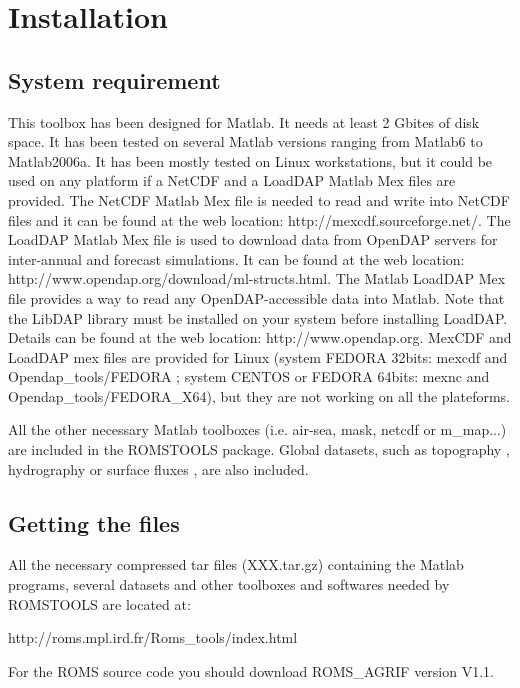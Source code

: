 \section{Installation}
\subsection{System requirement}
This toolbox has been designed for Matlab. It needs at least 
2 Gbites of disk space. It has been tested on several 
Matlab versions ranging from Matlab6 to Matlab2006a. It has been 
mostly tested on Linux workstations, but it could be used 
on any platform if a NetCDF and a LoadDAP  Matlab Mex files  
are provided. The NetCDF Matlab Mex file is needed to read 
and write into NetCDF files and it can be found at the web 
location: http://mexcdf.sourceforge.net/. The LoadDAP Matlab Mex file
is used to download data from OpenDAP servers for inter-annual and forecast 
simulations. It can be found at the web location: 
http://www.opendap.org/download/ml-structs.html. The Matlab 
LoadDAP Mex file provides a way to read any OpenDAP-accessible 
data into Matlab. Note that the LibDAP library must be installed
on your system before installing LoadDAP. Details can be found 
at the web location: http://www.opendap.org. MexCDF and LoadDAP mex 
files are provided for Linux (system FEDORA 32bits: mexcdf and 
Opendap\_tools/FEDORA ; system CENTOS or FEDORA 64bits: 
mexnc and Opendap\_tools/FEDORA\_X64), but they are not working 
on all the plateforms.

All the other necessary Matlab toolboxes (i.e. air-sea, mask, 
netcdf or m\_map...) are included in the ROMSTOOLS package. 
Global datasets, such as topography \citep{Smi97}, 
hydrography \citep{Con02} or surface fluxes \citep{Das94}, are 
also included.

\subsection{Getting the files}

All the necessary compressed tar files (XXX.tar.gz) containing 
the Matlab programs, several datasets  and other toolboxes and 
softwares needed by ROMSTOOLS are located at:
\begin{center}
http://roms.mpl.ird.fr/Roms\_tools/index.html 
\end{center}
For the ROMS source code you should download ROMS\_AGRIF version
V1.1.\\\\\\\\\\\\


